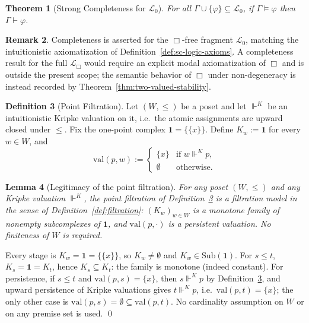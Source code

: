 \documentclass[final,12pt]{elsarticle}
\theoremstyle{plain}
\newtheorem{thm}{Theorem}[section]
\newtheorem{lem}[thm]{Lemma}
\theoremstyle{definition}
\newtheorem{defi}[thm]{Definition}
\newtheorem{rem}[thm]{Remark}
\begin{document}
\begin{thm}[Strong Completeness for \(\mathcal{L}_0\)]
\label{thm:completeness}
For all \(\Gamma\cup\{\varphi\}\subseteq\mathcal{L}_0\), if \(\Gamma \vDash \varphi\)
then \(\Gamma \vdash \varphi\).
\end{thm}

\begin{rem}
Completeness is asserted for the \(\Box\)-free fragment \(\mathcal{L}_0\), matching
the intuitionistic axiomatization of Definition~\ref{def:sc-logic-axioms}. A
completeness result for the full \(\mathcal{L}_\Box\) would require an explicit
modal axiomatization of \(\Box\) and is outside the present scope; the semantic
behavior of \(\Box\) under non-degeneracy is instead recorded by
Theorem~\ref{thm:two-valued-stability}.
\end{rem}

\begin{defi}[Point Filtration]
\label{def:point-filtration}
Let \((W,\le)\) be a poset and let \(\Vdash^{K}\) be an intuitionistic Kripke
valuation on it, i.e.\ the atomic assignments are upward closed under \(\le\).
Fix the one-point complex \(\mathbf 1 = \{\{x\}\}\). Define \(K_w := \mathbf 1\)
for every \(w \in W\), and
\[
  \mathrm{val}(p,w) :=
  \begin{cases}
    \{x\} & \text{if } w \Vdash^{K} p, \\
    \emptyset & \text{otherwise.}
  \end{cases}
\]
\end{defi}

\begin{lem}[Legitimacy of the point filtration]
\label{lem:point-legit}
For any poset \((W,\le)\) and any Kripke valuation \(\Vdash^{K}\), the point
filtration of Definition~\ref{def:point-filtration} is a filtration model in the
sense of Definition~\ref{def:filtration}: \((K_w)_{w\in W}\) is a monotone family
of nonempty subcomplexes of \(\mathbf 1\), and \(\mathrm{val}(p,\cdot)\) is a
persistent valuation. No finiteness of \(W\) is required.
\end{lem}

\proof
Every stage is \(K_w=\mathbf 1=\{\{x\}\}\), so \(K_w\neq\emptyset\) and
\(K_w\in\mathrm{Sub}(\mathbf 1)\). For \(s\le t\), \(K_s=\mathbf 1=K_t\), hence
\(K_s\subseteq K_t\): the family is monotone (indeed constant). For persistence,
if \(s\le t\) and \(\mathrm{val}(p,s)=\{x\}\), then \(s\Vdash^{K}p\) by
Definition~\ref{def:point-filtration}, and upward persistence of Kripke
valuations gives \(t\Vdash^{K}p\), i.e.\ \(\mathrm{val}(p,t)=\{x\}\); the only
other case is \(\mathrm{val}(p,s)=\emptyset\subseteq\mathrm{val}(p,t)\). No
cardinality assumption on \(W\) or on any premise set is used.
\qed
\end{document}
